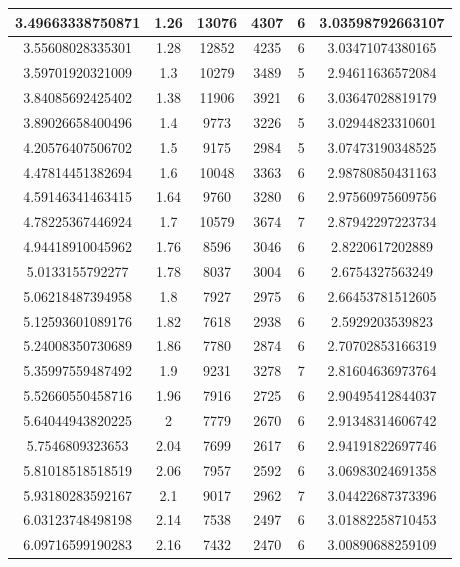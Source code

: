 \documentclass[a4paper]{report}
\numberwithin{equation}{section}
\begin{document}
\begin{table}[!ht]
\begin{tabular}{|c|c|c|c|c|c|}
        3.49663338750871 & 1.26 & 13076 & 4307 & 6 & 3.03598792663107 \\ \hline
        3.55608028335301 & 1.28 & 12852 & 4235 & 6 & 3.03471074380165 \\ \hline
        3.59701920321009 & 1.3 & 10279 & 3489 & 5 & 2.94611636572084 \\ \hline
        3.84085692425402 & 1.38 & 11906 & 3921 & 6 & 3.03647028819179 \\ \hline
        3.89026658400496 & 1.4 & 9773 & 3226 & 5 & 3.02944823310601 \\ \hline
        4.20576407506702 & 1.5 & 9175 & 2984 & 5 & 3.07473190348525 \\ \hline
        4.47814451382694 & 1.6 & 10048 & 3363 & 6 & 2.98780850431163 \\ \hline
        4.59146341463415 & 1.64 & 9760 & 3280 & 6 & 2.97560975609756 \\ \hline
        4.78225367446924 & 1.7 & 10579 & 3674 & 7 & 2.87942297223734 \\ \hline
        4.94418910045962 & 1.76 & 8596 & 3046 & 6 & 2.8220617202889 \\ \hline
        5.0133155792277 & 1.78 & 8037 & 3004 & 6 & 2.6754327563249 \\ \hline
        5.06218487394958 & 1.8 & 7927 & 2975 & 6 & 2.66453781512605 \\ \hline
        5.12593601089176 & 1.82 & 7618 & 2938 & 6 & 2.5929203539823 \\ \hline
        5.24008350730689 & 1.86 & 7780 & 2874 & 6 & 2.70702853166319 \\ \hline
        5.35997559487492 & 1.9 & 9231 & 3278 & 7 & 2.81604636973764 \\ \hline
        5.52660550458716 & 1.96 & 7916 & 2725 & 6 & 2.90495412844037 \\ \hline
        5.64044943820225 & 2 & 7779 & 2670 & 6 & 2.91348314606742 \\ \hline
        5.7546809323653 & 2.04 & 7699 & 2617 & 6 & 2.94191822697746 \\ \hline
        5.81018518518519 & 2.06 & 7957 & 2592 & 6 & 3.06983024691358 \\ \hline
        5.93180283592167 & 2.1 & 9017 & 2962 & 7 & 3.04422687373396 \\ \hline
        6.03123748498198 & 2.14 & 7538 & 2497 & 6 & 3.01882258710453 \\ \hline
        6.09716599190283 & 2.16 & 7432 & 2470 & 6 & 3.00890688259109 \\ \hline

\end{tabular}
\end{table}
\end{document}
